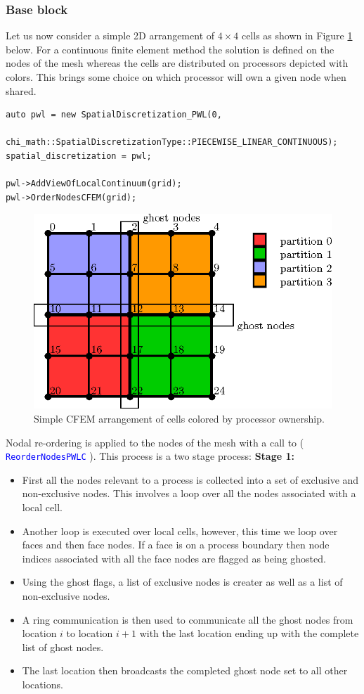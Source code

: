 \documentclass[11pt,letterpaper,titlepage]{article}
\newcommand{\xmltag}[1]{\textcolor{blue}{ \texttt{#1}} }
\numberwithin{equation}{section}
\begin{document}
\subsubsection{Base block}
Let us now consider a simple 2D arrangement of $4{\times}4$ cells as shown in Figure \ref{fig:fourbyfour} below. For a continuous finite element method the solution is defined on the nodes of the mesh whereas the cells are distributed on processors depicted with colors. This brings some choice on which processor will own a given node when shared.

\begin{lstlisting}
auto pwl = new SpatialDiscretization_PWL(0,
        chi_math::SpatialDiscretizationType::PIECEWISE_LINEAR_CONTINUOUS);
spatial_discretization = pwl;    

pwl->AddViewOfLocalContinuum(grid);
pwl->OrderNodesCFEM(grid);
\end{lstlisting}

\begin{figure}[H]
\centering
\includegraphics[width=0.5\linewidth]{Figures/DiscretizationBaseBlockCFEM.eps}
\caption{Simple CFEM arrangement of cells colored by processor ownership.}
\label{fig:fourbyfour}
\end{figure}
\noindent 
Nodal re-ordering is applied to the nodes of the mesh with a call to (\xmltag{ReorderNodesPWLC}). This process is a two stage process:
\newline
\newline
\textbf{Stage 1:}
\begin{itemize}
\item First all the nodes relevant to a process is collected into a set of exclusive and non-exclusive nodes. This involves a loop over all the nodes associated with a local cell.
\item Another loop is executed over local cells, however, this time we loop over faces and then face nodes. If a face is on a process boundary then node indices associated with all the face nodes are flagged as being ghosted.
\item Using the ghost flags, a list of exclusive nodes is creater as well as a list of non-exclusive nodes.
\item A ring communication is then used to communicate all the ghost nodes from location $i$ to location $i+1$ with the last location ending up with the complete list of ghost nodes. 
\item The last location then broadcasts the completed ghost node set to all other locations.
\end{itemize}
\end{document}
